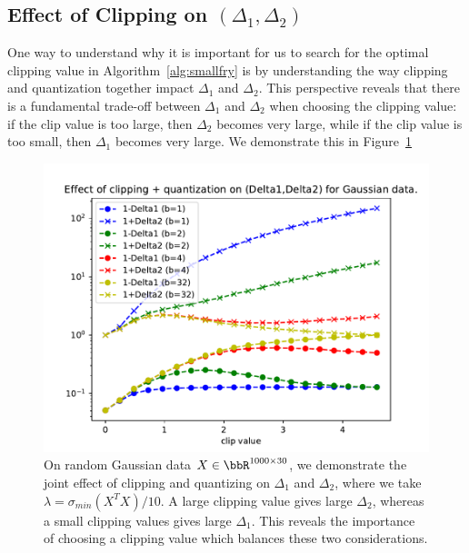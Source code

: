 \subsection{Effect of Clipping on $(\Delta_1,\Delta_2)$}
\label{sec:theory_clipping}
One way to understand why it is important for us to search for the optimal clipping value in Algorithm~\ref{alg:smallfry} is by understanding the way clipping and quantization together impact $\Delta_1$ and $\Delta_2$.
This perspective reveals that there is a fundamental trade-off between $\Delta_1$ and $\Delta_2$ when choosing the clipping value:
if the clip value is too large, then $\Delta_2$ becomes very large, while if the clip value is too small, then $\Delta_1$ becomes very large.
We demonstrate this in Figure~\ref{fig:deltas_vs_clip_quant}
\begin{figure}
	\begin{center}
		\centerline{\includegraphics[width=0.8\columnwidth]{figures/deltas_vs_clip_and_quant.pdf}}
		\caption{On random Gaussian data $X \in \RR^{1000\times 30}$, we demonstrate the joint effect of clipping and quantizing on $\Delta_1$ and $\Delta_2$, where we take $\lambda = \sigma_{min}(X^T X)/10$.
		A large clipping value gives large $\Delta_2$, whereas a small clipping values gives large $\Delta_1$.
		This reveals the importance of choosing a clipping value which balances these two considerations.
		}
		\label{fig:deltas_vs_clip_quant}
	\end{center}
\end{figure}
